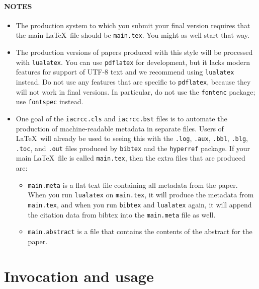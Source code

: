 \documentclass{iacrcc}
\begin{document}
\paragraph*{NOTES}
\begin{itemize}
\item The production system to which you submit your final version requires
  that the main \LaTeX\ file should be \texttt{main.tex}. You might as
  well start that way.
\item The production versions of papers produced with this style will
  be processed with \texttt{lualatex}.  You can use \texttt{pdflatex}
  for development, but it lacks modern features for support of UTF-8
  text and we recommend using \texttt{lualatex} instead.  Do not use
  any features that are specific to \texttt{pdflatex}, because they
  will not work in final versions. In particular, do not use the
  \texttt{fontenc} package; use \texttt{fontspec} instead.
\item One goal of the \texttt{iacrcc.cls} and \texttt{iacrcc.bst}
  files is to automate the production of machine-readable metadata in
  separate files. Users of \LaTeX\ will already be used to seeing this
  with the \texttt{.log}, \texttt{.aux}, \texttt{.bbl}, \texttt{.blg},
  \texttt{.toc}, and \texttt{.out} files produced by \texttt{bibtex}
  and the \texttt{hyperref} package.  If your main \LaTeX\ file is
  called \texttt{main.tex}, then the extra files that are produced
  are:
\begin{itemize}
\item \texttt{main.meta} is a flat text file containing all metadata
  from the paper.  When you run \texttt{lualatex} on
  \texttt{main.tex}, it will produce the metadata from
  \texttt{main.tex}, and when you run \texttt{bibtex} and
  \texttt{lualatex} again, it will append the citation data from
  bibtex into the \texttt{main.meta} file as well.
\item \texttt{main.abstract} is a file that contains the contents of
  the abstract for the paper.
\end{itemize}
\end{itemize}
\section{Invocation and usage}
\end{document}
